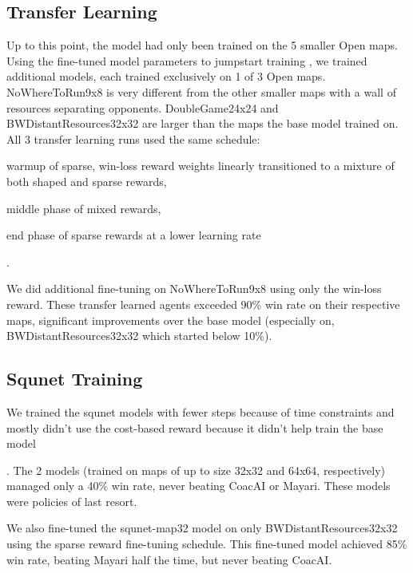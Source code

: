 \documentclass[conference]{IEEEtran}
\newif\ifsupplemental
\newcommand{\supptableref}[1]{%
  \ifsupplemental
    \ (Supplemental Table~\ref{#1})%
  \fi
}
\newcommand{\mapname}[1]{#1} %
\newcounter{supptable}
\begin{document}
\subsection{Transfer Learning}
Up to this point, the model had only been trained on the 5 smaller Open maps. Using the
fine-tuned model parameters to jumpstart training \cite{DBLP:books/sp/12/Lazaric12}, we
trained additional models, each trained exclusively on 1 of 3 Open maps.
\mapname{NoWhereToRun9x8} is very different from the other smaller maps with a wall of
resources separating opponents. \mapname{DoubleGame24x24} and
\mapname{BWDistantResources32x32} are larger than the maps the base model trained on.
All 3 transfer learning runs used the same schedule:
\begin{inparaenum}[(1)]
    \item warmup of sparse, win-loss reward weights linearly transitioned to a mixture
    of both shaped and sparse rewards,
    \item middle phase of mixed rewards,
    \item end phase of sparse rewards at a lower learning rate\supptableref{tab:transfer-learning-schedule}.
\end{inparaenum}
We did additional fine-tuning on \mapname{NoWhereToRun9x8} using only the win-loss
reward. These transfer learned agents exceeded 90\% win rate on their respective maps,
significant improvements over the base model (especially on,
\mapname{BWDistantResources32x32} which started below 10\%).

\subsection{Squnet Training}
We trained the squnet models with fewer steps because of time constraints and mostly
didn't use the cost-based reward because it didn't help train the base
model\supptableref{tab:squnet-training-parameters}. The 2 models (trained on maps of up
to size 32x32 and 64x64, respectively) managed only a 40\% win rate, never beating
CoacAI or Mayari. These models were policies of last resort.

We also fine-tuned the squnet-map32 model on only \mapname{BWDistantResources32x32}
using the sparse reward fine-tuning schedule. This fine-tuned 
model achieved 85\% win rate, beating Mayari half the time, but never beating CoacAI.
\end{document}
